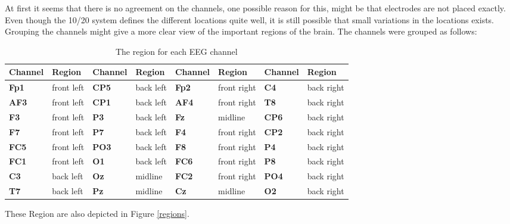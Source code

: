 At first it seems that there is no agreement on the channels, one possible reason for this, might be that electrodes are not placed exactly. Even though the 10/20 system defines the different locations quite well, it is still possible that small variations in the locations exists. Grouping the channels might give a more clear view of the important regions of the brain. The channels were grouped as follows: 
\begin{table}[H]
\centering
\caption{The region for each EEG channel}
\begin{tabular}{ll|ll|ll|ll}
\textbf{Channel} & \textbf{Region} & \textbf{Channel} & \textbf{Region} & \textbf{Channel} & \textbf{Region}      & \textbf{Channel} & \textbf{Region}     \\ \hline
\textbf{Fp1}     & front left      & \textbf{CP5}     & back left       & \textbf{Fp2}     & front right & \textbf{C4}      & back right \\
\textbf{AF3}     & front left      & \textbf{CP1}     & back left       & \textbf{AF4}     & front right & \textbf{T8}      & back right \\
\textbf{F3}      & front left      & \textbf{P3}      & back left       & \textbf{Fz}      & midline     & \textbf{CP6}     & back right \\
\textbf{F7}      & front left      & \textbf{P7}      & back left       & \textbf{F4}      & front right & \textbf{CP2}     & back right \\
\textbf{FC5}     & front left      & \textbf{PO3}     & back left       & \textbf{F8}      & front right & \textbf{P4}      & back right \\
\textbf{FC1}     & front left      & \textbf{O1}      & back left       & \textbf{FC6}     & front right & \textbf{P8}      & back right \\
\textbf{C3}      & back left       & \textbf{Oz}      & midline         & \textbf{FC2}     & front right & \textbf{PO4}     & back right \\
\textbf{T7}      & back left       & \textbf{Pz}      & midline         & \textbf{Cz}      & midline     & \textbf{O2}      & back right
\end{tabular}
\end{table}

These Region are also depicted in Figure \ref{regions}.

